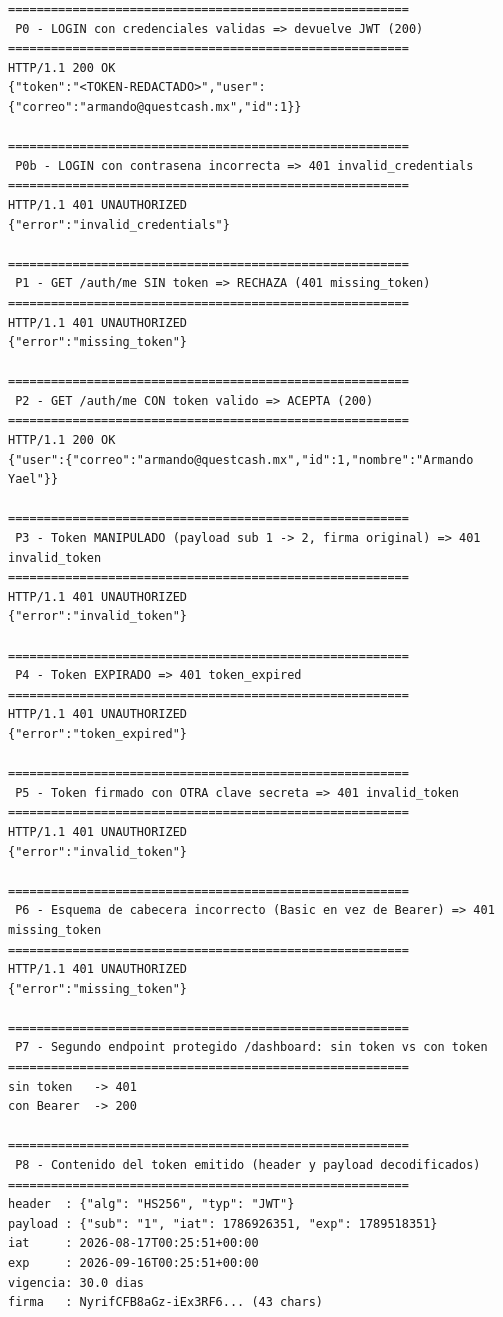 \documentclass[11pt,letterpaper]{article}
\begin{document}
\begin{consola}[title={\$ ./pruebas.sh}]
\begin{lstlisting}[style=terminal]
========================================================
 P0 - LOGIN con credenciales validas => devuelve JWT (200)
========================================================
HTTP/1.1 200 OK
{"token":"<TOKEN-REDACTADO>","user":{"correo":"armando@questcash.mx","id":1}}

========================================================
 P0b - LOGIN con contrasena incorrecta => 401 invalid_credentials
========================================================
HTTP/1.1 401 UNAUTHORIZED
{"error":"invalid_credentials"}

========================================================
 P1 - GET /auth/me SIN token => RECHAZA (401 missing_token)
========================================================
HTTP/1.1 401 UNAUTHORIZED
{"error":"missing_token"}

========================================================
 P2 - GET /auth/me CON token valido => ACEPTA (200)
========================================================
HTTP/1.1 200 OK
{"user":{"correo":"armando@questcash.mx","id":1,"nombre":"Armando Yael"}}

========================================================
 P3 - Token MANIPULADO (payload sub 1 -> 2, firma original) => 401 invalid_token
========================================================
HTTP/1.1 401 UNAUTHORIZED
{"error":"invalid_token"}

========================================================
 P4 - Token EXPIRADO => 401 token_expired
========================================================
HTTP/1.1 401 UNAUTHORIZED
{"error":"token_expired"}

========================================================
 P5 - Token firmado con OTRA clave secreta => 401 invalid_token
========================================================
HTTP/1.1 401 UNAUTHORIZED
{"error":"invalid_token"}

========================================================
 P6 - Esquema de cabecera incorrecto (Basic en vez de Bearer) => 401 missing_token
========================================================
HTTP/1.1 401 UNAUTHORIZED
{"error":"missing_token"}

========================================================
 P7 - Segundo endpoint protegido /dashboard: sin token vs con token
========================================================
sin token   -> 401
con Bearer  -> 200

========================================================
 P8 - Contenido del token emitido (header y payload decodificados)
========================================================
header  : {"alg": "HS256", "typ": "JWT"}
payload : {"sub": "1", "iat": 1786926351, "exp": 1789518351}
iat     : 2026-08-17T00:25:51+00:00
exp     : 2026-09-16T00:25:51+00:00
vigencia: 30.0 dias
firma   : NyrifCFB8aGz-iEx3RF6... (43 chars)
\end{lstlisting}
\end{consola}
\end{document}
